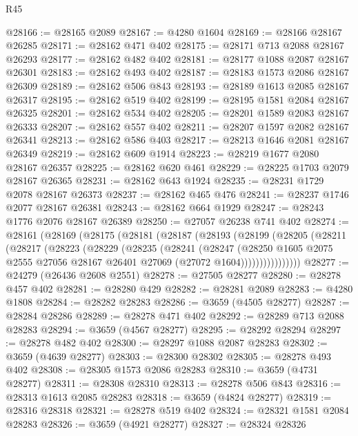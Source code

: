 \begin{lexlean}{R45}
\begin{coremodule}
@28166 := @28165 @2089
@28167 := @4280 @1604
@28169 := @28166 @28167 @26285
@28171 := @28162 @471 @402
@28175 := @28171 @713 @2088 @28167 @26293
@28177 := @28162 @482 @402
@28181 := @28177 @1088 @2087 @28167 @26301
@28183 := @28162 @493 @402
@28187 := @28183 @1573 @2086 @28167 @26309
@28189 := @28162 @506 @843
@28193 := @28189 @1613 @2085 @28167 @26317
@28195 := @28162 @519 @402
@28199 := @28195 @1581 @2084 @28167 @26325
@28201 := @28162 @534 @402
@28205 := @28201 @1589 @2083 @28167 @26333
@28207 := @28162 @557 @402
@28211 := @28207 @1597 @2082 @28167 @26341
@28213 := @28162 @586 @403
@28217 := @28213 @1646 @2081 @28167 @26349
@28219 := @28162 @609 @1914
@28223 := @28219 @1677 @2080 @28167 @26357
@28225 := @28162 @620 @461
@28229 := @28225 @1703 @2079 @28167 @26365
@28231 := @28162 @643 @1924
@28235 := @28231 @1729 @2078 @28167 @26373
@28237 := @28162 @465 @476
@28241 := @28237 @1746 @2077 @28167 @26381
@28243 := @28162 @664 @1929
@28247 := @28243 @1776 @2076 @28167 @26389
@28250 := @27057 @26238 @741 @402
@28274 := @28161
    (@28169
      (@28175
        (@28181
          (@28187
            (@28193
              (@28199
                (@28205
                  (@28211
                    (@28217
                      (@28223
                        (@28229
                          (@28235
                            (@28241
                              (@28247
                                (@28250
                                  @1605
                                  @2075
                                  @2555
                                  @27056
                                  @28167
                                  @26401
                                  @27069
                                  (@27072 @1604))))))))))))))))
@28277 := @24279 (@26436 @2608 @2551)
@28278 := @27505 @28277
@28280 := @28278 @457 @402
@28281 := @28280 @429
@28282 := @28281 @2089
@28283 := @4280 @1808
@28284 := @28282 @28283
@28286 := @3659 (@4505 @28277)
@28287 := @28284 @28286
@28289 := @28278 @471 @402
@28292 := @28289 @713 @2088 @28283
@28294 := @3659 (@4567 @28277)
@28295 := @28292 @28294
@28297 := @28278 @482 @402
@28300 := @28297 @1088 @2087 @28283
@28302 := @3659 (@4639 @28277)
@28303 := @28300 @28302
@28305 := @28278 @493 @402
@28308 := @28305 @1573 @2086 @28283
@28310 := @3659 (@4731 @28277)
@28311 := @28308 @28310
@28313 := @28278 @506 @843
@28316 := @28313 @1613 @2085 @28283
@28318 := @3659 (@4824 @28277)
@28319 := @28316 @28318
@28321 := @28278 @519 @402
@28324 := @28321 @1581 @2084 @28283
@28326 := @3659 (@4921 @28277)
@28327 := @28324 @28326

\end{coremodule}
\end{lexlean}
